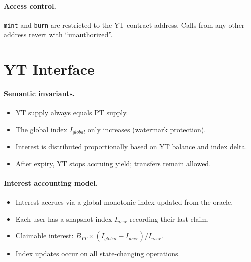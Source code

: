 \paragraph{Access control.}
\texttt{mint} and \texttt{burn} are restricted to the YT contract address. Calls from any other address revert with ``unauthorized''.


\section{YT Interface}

\paragraph{Semantic invariants.}
\begin{itemize}
\item YT supply always equals PT supply.
\item The global index $I_{global}$ only increases (watermark protection).
\item Interest is distributed proportionally based on YT balance and index delta.
\item After expiry, YT stops accruing yield; transfers remain allowed.
\end{itemize}

\paragraph{Interest accounting model.}
\begin{itemize}
\item Interest accrues via a global monotonic index updated from the oracle.
\item Each user has a snapshot index $I_{user}$ recording their last claim.
\item Claimable interest: $B_{YT} \times (I_{global} - I_{user}) / I_{user}$.
\item Index updates occur on all state-changing operations.
\end{itemize}

